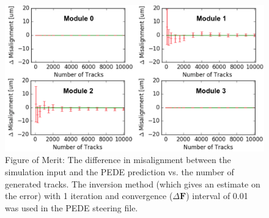 \documentclass[a4paper,11pt]{article}
\begin{document}
\clearpage
\begin{figure}[!ht]
	\centering
	\includegraphics[scale = 0.33]{fig/PEDE.png}
	\vspace{-0.3cm}
	\caption{Figure of Merit: The difference in misalignment 
		between the simulation input and the PEDE 
		prediction vs. the number of generated tracks. The inversion method (which gives an estimate on the error) with 1 iteration and convergence ($\Delta \boldsymbol{F}$) interval of 0.01 was used in the PEDE steering file.}
	\label{fig:pede}
\end{figure}
\vspace{-0.6cm}
\end{document}
